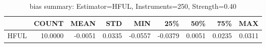 \begin{table}[ht]
\centering
\caption{bias summary: Estimator=HFUL, Instruments=250, Strength=0.40}
\begin{tabular}{lrrrrrrrr}
\toprule
 & COUNT & MEAN & STD & MIN & 25\% & 50\% & 75\% & MAX \\
\midrule
HFUL & 10.0000 & -0.0051 & 0.0335 & -0.0557 & -0.0379 & 0.0051 & 0.0235 & 0.0311 \\
\bottomrule
\end{tabular}
\end{table}
